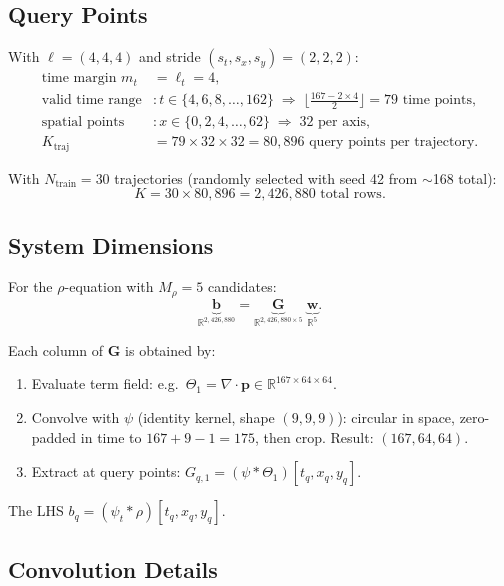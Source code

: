 \documentclass[11pt, letterpaper]{article}
\theoremstyle{definition}
\newcommand{\R}{\mathbb{R}}
\newcommand{\vp}{\mathbf{p}}
\newcommand{\vw}{\mathbf{w}}
\newcommand{\vb}{\mathbf{b}}
\newcommand{\vG}{\mathbf{G}}
\newcommand{\divop}{\nabla\!\cdot}
\begin{document}
\subsection{Query Points}
With $\bm\ell = (4,4,4)$ and stride $(s_t, s_x, s_y) = (2, 2, 2)$:
\begin{align}
  \text{time margin } m_t &= \ell_t = 4, \nonumber\\
  \text{valid time range} &: t \in \{4, 6, 8, \dots, 162\}
    \;\Rightarrow\;
    \bigl\lfloor\tfrac{167 - 2\times 4}{2}\bigr\rfloor = 79 \text{ time points},
    \nonumber\\
  \text{spatial points} &: x \in \{0, 2, 4, \dots, 62\} \;\Rightarrow\; 32 \text{ per axis},
    \nonumber\\
  K_{\mathrm{traj}} &= 79 \times 32 \times 32 = 80{,}896 \text{ query points per trajectory}.
\end{align}

With $N_{\mathrm{train}} = 30$ trajectories (randomly selected with
seed 42 from $\sim$168 total):
\begin{equation}
  K = 30 \times 80{,}896 = 2{,}426{,}880 \text{ total rows.}
\end{equation}

\subsection{System Dimensions}
For the $\rho$-equation with $M_\rho = 5$ candidates:
\begin{equation}
  \underbrace{\vb}_{\R^{2{,}426{,}880}}
  = \underbrace{\vG}_{\R^{2{,}426{,}880 \times 5}}
  \;\underbrace{\vw}_{\R^{5}}.
\end{equation}

Each column of $\vG$ is obtained by:
\begin{enumerate}[nosep]
  \item Evaluate term field: e.g.\
    $\Theta_1 = \divop\vp \in \R^{167 \times 64 \times 64}$.
  \item Convolve with $\psi$ (identity kernel, shape
    $(9, 9, 9)$): circular in space, zero-padded in time to
    $167 + 9 - 1 = 175$, then crop.  Result: $(167, 64, 64)$.
  \item Extract at query points: $G_{q,1} = (\psi * \Theta_1)[t_q, x_q, y_q]$.
\end{enumerate}

The LHS $b_q = (\psi_t * \rho)[t_q, x_q, y_q]$.

\subsection{Convolution Details}
\end{document}

